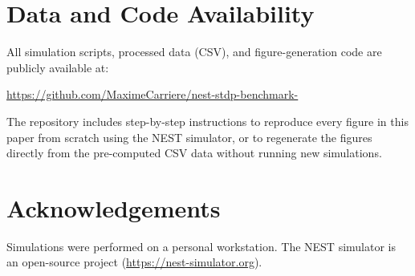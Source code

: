 \documentclass[10pt,twocolumn]{article}
\begin{document}
\section*{Data and Code Availability}
All simulation scripts, processed data (CSV), and figure-generation
code are publicly available at:
\begin{center}
  \url{https://github.com/MaximeCarriere/nest-stdp-benchmark-}
\end{center}
The repository includes step-by-step instructions to reproduce every
figure in this paper from scratch using the NEST simulator, or to
regenerate the figures directly from the pre-computed CSV data without
running new simulations.

\section*{Acknowledgements}
Simulations were performed on a personal workstation.
The NEST simulator is an open-source project (\url{https://nest-simulator.org}).
\end{document}

